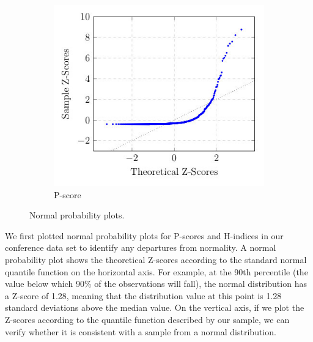 \documentclass[man]{apa6}
\begin{document}
\begin{figure}[h]
\begin{subfigure}[b]{0.4\textwidth}
\end{subfigure}  
\begin{subfigure}[b]{0.4\textwidth}
    \centerline{\includegraphics[scale=0.45]{normal_plot_pscore}}

    \caption{P-score}
    \label{fig:pscore_normality}

\end{subfigure}  
\caption{Normal probability plots.}
\end{figure}

We first plotted normal probability plots for P-scores and H-indices in our conference data set 
to identify any departures from normality. A normal probability plot shows the theoretical Z-scores
according to the standard normal quantile function on the horizontal axis. For example, at the 90th
percentile (the value below which 90\% of the observations will fall), the normal distribution has a
Z-score of 1.28, meaning that the distribution value at this point is 1.28 standard deviations above the median value. On the vertical axis, if
we plot the Z-scores according to the quantile function described by our sample, we can verify
whether it is consistent with a sample from a normal distribution.
\end{document}
